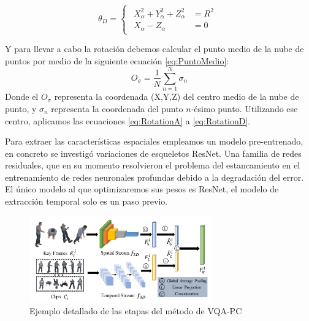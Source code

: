 \begin{equation}
  \theta_D = 
\begin{cases}
\begin{aligned}
   X_\alpha^2 + Y_\alpha^2 + Z_\alpha^2 & = R^2 \\ 
    X_\alpha - Z_\alpha & = 0 
\end{aligned}
\end{cases}
\label{eq:RotationD}
\end{equation}

Y para llevar a cabo la rotación debemos calcular el punto medio de la nube 
de puntos por medio de la siguiente ecuación \eqref{eq:PuntoMedio}:
\begin{equation}
  O_\sigma = \frac{1}{N}\sum_{n=1}^N \sigma_n
  \label{eq:PuntoMedio}
\end{equation}
Donde el $O_\sigma$ representa la coordenada (X,Y,Z) del centro medio de la 
nube de punto, y $\sigma_n$ representa la coordenada del punto $n$-ésimo punto. 
Utilizando ese centro, aplicamos las ecuaciones \eqref{eq:RotationA} a \eqref{eq:RotationD}.

Para extraer las características espaciales empleamos un modelo pre-entrenado, 
en concreto se investigó variaciones de esqueletos ResNet\cite{ResNet}. Una 
familia de redes residuales, que en su momento resolvieron el problema 
del estancamiento en el entrenamiento de redes neuronales profundas debido 
a la degradación del error. El único modelo al que optimizaremos sus pesos es 
ResNet, el modelo de extracción temporal solo es un paso previo.

\begin{figure}[htp]
  \begin{center}
    \includegraphics[width=0.70\textwidth]{imagenes/chapter4/PipelineCompleto}
  \end{center}
  \caption{Ejemplo detallado de las etapas del método de VQA-PC}
  \label{fig:VQAPipeline}
\end{figure}



